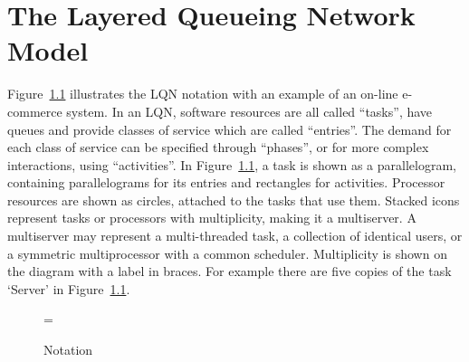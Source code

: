 
\chapter{The Layered Queueing Network Model}
\label{sec:lqn}

Figure~\ref{fig:bookstore} illustrates the LQN notation with an
example of an on-line e-commerce system. In an LQN, software
resources are all called
``tasks'', have queues and provide classes of
service which are called ``entries''.  The
demand for each class of service
can be specified through ``phases'', or for more complex
interactions, using ``activities''.  In
Figure~\ref{fig:bookstore}, a task is shown as a parallelogram,
containing parallelograms for its entries and rectangles for
activities. Processor resources are shown as circles,
attached to the tasks that use them. Stacked icons
represent tasks or processors with multiplicity,
making it a multiserver. A multiserver may
represent a multi-threaded task, a collection of identical users, or a
symmetric multiprocessor with a common scheduler.
Multiplicity is shown on the diagram with a label
in braces. For example there are five copies of the task `Server' in
Figure~\ref{fig:bookstore}.

\begin{figure}[htbp]
  \centering
  \epsfxsize=\textwidth
  \caption{Notation}
  \label{fig:bookstore}
\end{figure}

